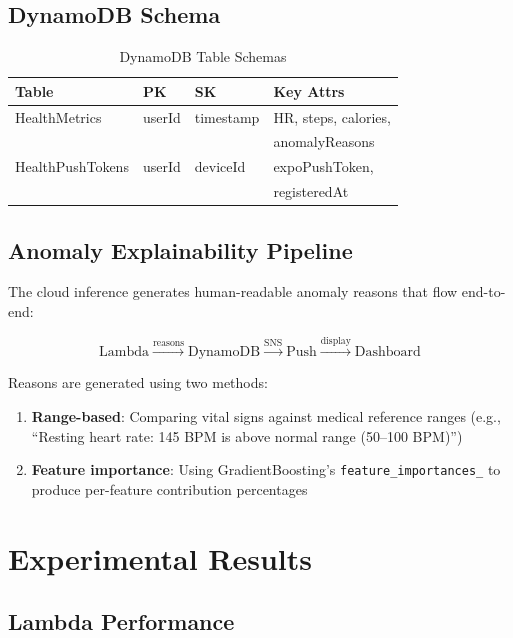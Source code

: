 \documentclass[conference]{IEEEtran}
\begin{document}
\subsection{DynamoDB Schema}

\begin{table}[H]
\centering
\caption{DynamoDB Table Schemas}
\label{tab:dynamodb}
\begin{tabular}{llll}
\toprule
\textbf{Table} & \textbf{PK} & \textbf{SK} & \textbf{Key Attrs} \\
\midrule
HealthMetrics & userId & timestamp & HR, steps, calories, \\
 & & & anomalyReasons \\
HealthPushTokens & userId & deviceId & expoPushToken, \\
 & & & registeredAt \\
\bottomrule
\end{tabular}
\end{table}

\subsection{Anomaly Explainability Pipeline}
The cloud inference generates human-readable anomaly reasons that flow end-to-end:

\begin{equation}
\text{Lambda} \xrightarrow{\text{reasons}} \text{DynamoDB} \xrightarrow{\text{SNS}} \text{Push} \xrightarrow{\text{display}} \text{Dashboard}
\end{equation}

Reasons are generated using two methods:
\begin{enumerate}
    \item \textbf{Range-based}: Comparing vital signs against medical reference ranges (e.g., ``Resting heart rate: 145 BPM is above normal range (50--100 BPM)'')
    \item \textbf{Feature importance}: Using GradientBoosting's \texttt{feature\_importances\_} to produce per-feature contribution percentages
\end{enumerate}

\section{Experimental Results}

\subsection{Lambda Performance}
\end{document}
